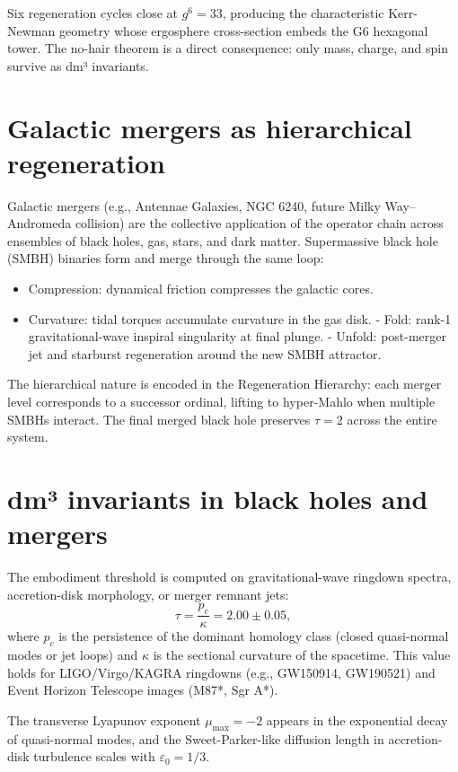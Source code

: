 \documentclass[19pt]{book}
\theoremstyle{plain}
\theoremstyle{definition}
\theoremstyle{remark}
\begin{document}
Six regeneration cycles close at \(g^6 = 33\), producing the characteristic Kerr-Newman geometry whose ergosphere cross-section embeds the G6 hexagonal tower. The no-hair theorem is a direct consequence: only mass, charge, and spin survive as dm³ invariants.

\section{Galactic mergers as hierarchical regeneration}

Galactic mergers (e.g., Antennae Galaxies, NGC 6240, future Milky Way–Andromeda collision) are the collective application of the operator chain across ensembles of black holes, gas, stars, and dark matter. Supermassive black hole (SMBH) binaries form and merge through the same loop:

\begin{itemize}
\item Compression: dynamical friction compresses the galactic cores.
\item Curvature: tidal torques accumulate curvature in the gas disk.
- Fold: rank-1 gravitational-wave inspiral singularity at final plunge.
- Unfold: post-merger jet and starburst regeneration around the new SMBH attractor.
\end{itemize}

The hierarchical nature is encoded in the Regeneration Hierarchy: each merger level corresponds to a successor ordinal, lifting to hyper-Mahlo when multiple SMBHs interact. The final merged black hole preserves \(\tau = 2\) across the entire system.

\section{dm³ invariants in black holes and mergers}

The embodiment threshold is computed on gravitational-wave ringdown spectra, accretion-disk morphology, or merger remnant jets:
\[
\tau = \frac{p_c}{\kappa} = 2.00 \pm 0.05,
\]
where \(p_c\) is the persistence of the dominant homology class (closed quasi-normal modes or jet loops) and \(\kappa\) is the sectional curvature of the spacetime. This value holds for LIGO/Virgo/KAGRA ringdowns (e.g., GW150914, GW190521) and Event Horizon Telescope images (M87*, Sgr A*).

The transverse Lyapunov exponent \(\mu_{\max} = -2\) appears in the exponential decay of quasi-normal modes, and the Sweet-Parker-like diffusion length in accretion-disk turbulence scales with \(\varepsilon_0 = 1/3\).
\end{document}
